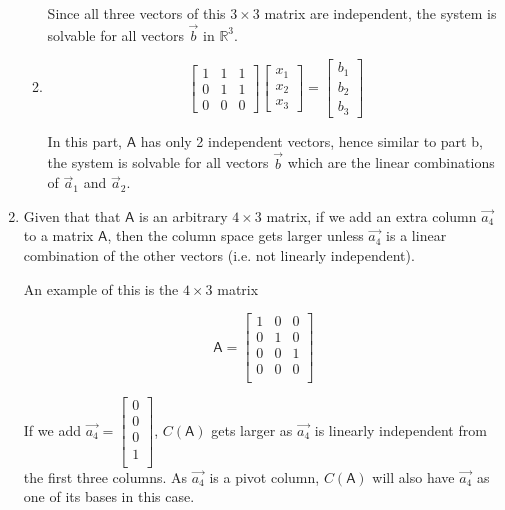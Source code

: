 \documentclass[a4paper, 11pt]{article}
\newcommand{\mat}[1]{\boldsymbol { \mathsf{#1}} }
\begin{document}
\begin{enumerate}
\begin{enumerate}
Since all three vectors of this $3\times3$ matrix are independent, the system is solvable for all vectors $\vec b$ in $\mathds{R}^3$.
\item
\[
 \left[ \begin{array}{ccc}
1  & 1 & 1\\
0  & 1 & 1\\
0 & 0 & 0
\end{array} \right]
%
\left[ \begin{array}{c}
 x_1\\
 x_2\\
x_3
\end{array} \right]
%
= \left[ \begin{array}{c}
 b_1\\
 b_2\\
 b_3 
\end{array} \right]
\]

In this part, $\mat A$ has only 2 independent vectors, hence similar to part b, the system is solvable for all vectors $\vec b$ which are the linear combinations of $\vec a_1$ and $\vec a_2$.

\end{enumerate}

\item Given that that $\mat{A}$ is an arbitrary $4 \times 3$ matrix, if we add an extra column $\vec{a_4}$ to a matrix $\mat{A}$, then the column space gets larger unless $\vec{a_4}$ is a linear combination of the other vectors (i.e. not linearly independent).

An example of this is the $4 \times 3$ matrix

\begin{equation*}
\mat{A} = 
	\begin{bmatrix}
	1 & 0 & 0 \\
	0 & 1 & 0 \\
	0 & 0 & 1 \\
	0 & 0 & 0 \\
	\end{bmatrix}
\end{equation*}

If we add $\vec{a_4} = \begin{bmatrix}
0 \\
0 \\
0 \\
1 \\
\end{bmatrix}$, $C(\mat{A})$ gets larger as $\vec{a_4}$ is linearly independent from the first three columns. As $\vec{a_4}$ is a pivot column, $C(\mat{A})$ will also have $\vec{a_4}$ as one of its bases in this case.


\end{enumerate}
\end{document}
